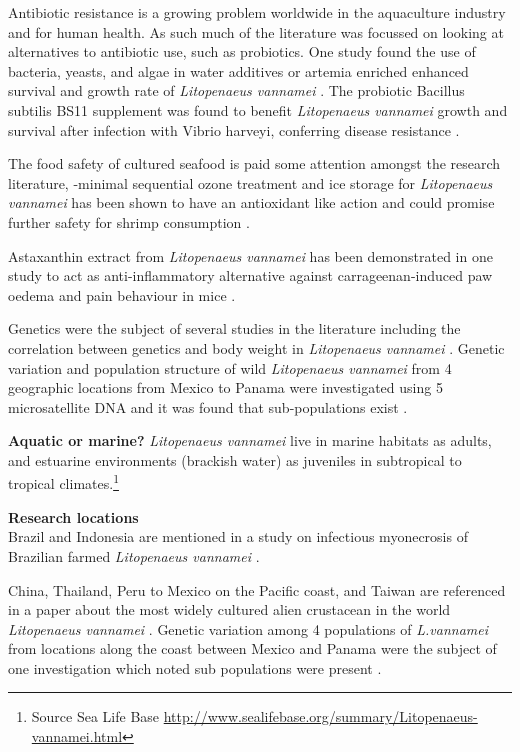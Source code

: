 \documentclass[]{book}
\theoremstyle{definition}
\theoremstyle{definition}
\theoremstyle{definition}
\theoremstyle{remark}
\begin{document}
Antibiotic resistance is a growing problem worldwide in the aquaculture
industry and for human health. As such much of the literature was
focussed on looking at alternatives to antibiotic use, such as
probiotics. One study found the use of bacteria, yeasts, and algae in
water additives or artemia enriched enhanced survival and growth rate of
\emph{Litopenaeus vannamei} \citep{Nimrat_2011}. The probiotic Bacillus
subtilis BS11 supplement was found to benefit \emph{Litopenaeus
vannamei} growth and survival after infection with Vibrio harveyi,
conferring disease resistance \citep{Sapcharoen_2013}.

The food safety of cultured seafood is paid some attention amongst the
research literature, -minimal sequential ozone treatment and ice storage
for \emph{Litopenaeus vannamei} has been shown to have an antioxidant
like action and could promise further safety for shrimp consumption
\citep{Okpala_2014}.

Astaxanthin extract from \emph{Litopenaeus vannamei} has been
demonstrated in one study to act as anti-inflammatory alternative
against carrageenan-induced paw oedema and pain behaviour in mice
\citep{Kuedo_2016}.

Genetics were the subject of several studies in the literature including
the correlation between genetics and body weight in \emph{Litopenaeus
vannamei} \citep{Glenn_2005}. Genetic variation and population structure
of wild \emph{Litopenaeus vannamei} from 4 geographic locations from
Mexico to Panama were investigated using 5 microsatellite DNA and it was
found that sub-populations exist \citep{Valles_Jimenez_2004}.

\textbf{Aquatic or marine?} \emph{Litopenaeus vannamei} live in marine
habitats as adults, and estuarine environments (brackish water) as
juveniles in subtropical to tropical climates.\footnote{Source Sea Life
  Base
  \url{http://www.sealifebase.org/summary/Litopenaeus-vannamei.html}}

\textbf{Research locations}\\
Brazil and Indonesia are mentioned in a study on infectious myonecrosis
of Brazilian farmed \emph{Litopenaeus vannamei} \citep{Silva_2010}.

China, Thailand, Peru to Mexico on the Pacific coast, and Taiwan are
referenced in a paper about the most widely cultured alien crustacean in
the world \emph{Litopenaeus vannamei} \citep{Liao_2011}. Genetic
variation among 4 populations of \emph{L.vannamei} from locations along
the coast between Mexico and Panama were the subject of one
investigation which noted sub populations were present
\citep{Valles_Jimenez_2004}.
\end{document}
